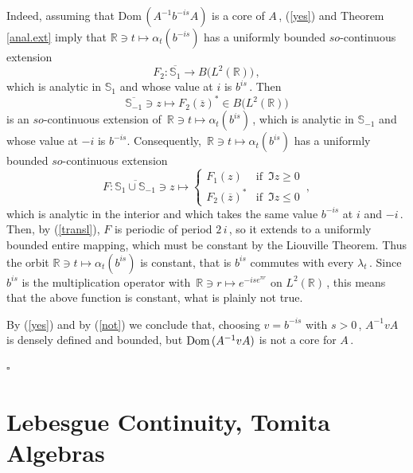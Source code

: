 \documentclass[reqno]{amsart}
\theoremstyle{definition}
\theoremstyle{remark}
\numberwithin{equation}{section}
\theoremstyle{plain}
\begin{document}
Indeed, assuming that $\text{Dom}\, (A^{-1} b^{-is} A)$ is a core
of $A\,$, (\ref{yes}) and Theorem \ref{anal.ext} imply that
$\mathbb R\ni t\longmapsto \alpha_t (b^{-is})$ has a uniformly
bounded $so$-continuous extension
\begin{equation*}
F_2 : \overline{\mathbb S_1}\longrightarrow B\big( L^2(\mathbb R )
\big)\, ,
\end{equation*}
which is analytic in $\mathbb S_1$ and whose value at $i$ is
$b^{is}\,$. Then
\begin{equation*}
\overline{\mathbb S_{-1}}\ni z\longmapsto F_2 (\overline{z})^*\in
B\big( L^2(\mathbb R )\big)
\end{equation*}
is an $so$-continuous extension of $\,\mathbb R\ni t\longmapsto
\alpha_t (b^{is})\,$, which is analytic in $\mathbb S_{-1}$ and
whose value at $-i$ is $b^{-is}$. Consequently, $\,\mathbb R\ni
t\longmapsto\alpha_t (b^{is})$ has a uniformly bounded
$so$-continuous extension
\begin{equation*}
F : \overline{\mathbb S_1\cup \mathbb S_{-1}}\ni z\longmapsto
\left\{ \begin{array}{ll} F_1 (z) &\text{if }\,\Im z\geq 0 \\
F_2 (\overline{z})^* &\text{if }\,\Im z\leq 0 \end{array}\right.
\, ,
\end{equation*}
which is analytic in the interior and which takes the same value
$b^{-is}$ at $i$ and $-i\,$. Then, by (\ref{transl}), $F$ is periodic
of period $2\, i\,$, so it extends to a uniformly bounded entire
mapping, which must be constant by the Liouville Theorem. Thus
the orbit $\mathbb R\ni t\longmapsto\alpha_t (b^{is})$ is constant,
that is $b ^{is}$ commutes with every $\lambda_t\,$. Since $b ^{is}$
is the multiplication operator with $\,\mathbb R\ni r\longmapsto
e^{-ise^{\pi r}}$ on $L^2(\mathbb R )\,$, this means that the above
function is constant, what is plainly not true.

By (\ref{yes}) and by (\ref{not}) we conclude that, choosing
$v=b ^{-is}$ with $s>0\,$, $A^{-1} v A$ is densely defined and
bounded, but $\text{\rm Dom}\, (A^{-1} v A)$ is not a core for $A\,$.

\hfill $\square\quad$

\bigskip
\section{Lebesgue Continuity, Tomita Algebras}
\bigskip
\end{document}
